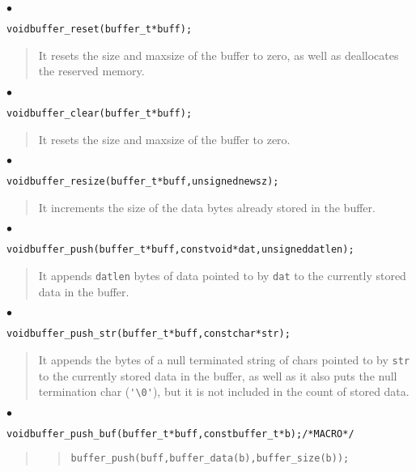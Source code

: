 \documentclass[a4paper]{article}
\newenvironment{code}%
{\begin{quote}\footnotesize\begin{alltt}}%
{\end{alltt}\end{quote}}%
\newenvironment{api}%
{\noindent$\bullet$\hfill\begin{minipage}[t]{0.97\linewidth}\footnotesize\begin{alltt}}%
{\end{alltt}\end{minipage}}%
\begin{document}
\begin{api}
void buffer_reset(buffer_t* buff);
\end{api}
\begin{quote}\footnotesize
It resets the size and maxsize of the buffer to zero, as well as
deallocates the reserved memory.
\end{quote}
\begin{api}
void buffer_clear(buffer_t* buff);
\end{api}
\begin{quote}\footnotesize
It resets the size and maxsize of the buffer to zero.
\end{quote}
\begin{api}
void buffer_resize(buffer_t* buff, unsigned newsz);
\end{api}
\begin{quote}\footnotesize
It increments the size of the data bytes already stored in the buffer.
\end{quote}
\begin{api}
void buffer_push(buffer_t* buff, const void* dat, unsigned datlen);
\end{api}
\begin{quote}\footnotesize
It appends \verb|datlen| bytes of data pointed to by \verb|dat| to the
currently stored data in the buffer.
\end{quote}
\begin{api}
void buffer_push_str(buffer_t* buff, const char* str);
\end{api}
\begin{quote}\footnotesize
It appends the bytes of a null terminated string of chars pointed to
by \verb|str| to the currently stored data in the buffer, as well as
it also puts the null termination char (\verb|'\0'|), but it is not
included in the count of stored data.
\end{quote}
\begin{api}
void buffer_push_buf(buffer_t* buff, const buffer_t* b);  /* MACRO */
\end{api}
\begin{quote}\footnotesize
\begin{code}
buffer_push(buff, buffer_data(b), buffer_size(b));
\end{code}
\end{quote}
\end{document}
